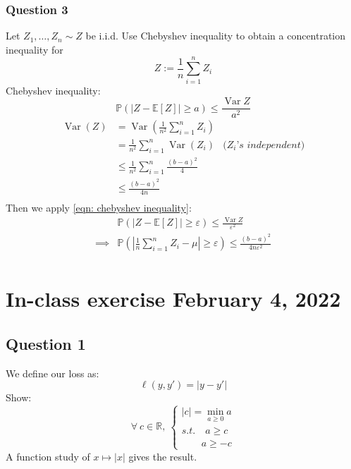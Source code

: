 \documentclass{article}
\newcommand{\1}{\mathbf{1}}
\newcommand{\E}{\mathbb{E}}
\newcommand{\R}{\mathbb{R}}
\renewcommand{\P}{\mathbb{P}}
\newcommand{\var}{\operatorname{Var}}
\begin{document}
\subsubsection{Question 3}
Let \(Z_1, \ldots, Z_n \sim Z\) be i.i.d. Use Chebyshev inequality to obtain a concentration inequality for
\begin{equation*}
  Z := \frac{1}{n} \sum_{i=1}^n Z_i
\end{equation*}
Chebyshev inequality:
\begin{equation}
  \label{eqn: chebyshev inequality}
  \P\left( |Z - \E[Z]| \geq a\right) \leq \frac{\var Z}{a^2}
\end{equation}
\begin{align*}
  \var\left(Z\right)
                                                  & =
  \var\left(\frac{1}{n^2}\sum_{i=1}^n Z_i\right)                                     \\
                                                  & =
  \frac{1}{n^2} \sum_{i=1}^n \var\left(Z_i\right) & \textit{(\(Z_i\)'s independent)} \\
                                                  & \leq
  \frac{1}{n^2} \sum_{i=1}^n \frac{\left(b-a\right)^2}{4}                            \\
                                                  & \leq
  \frac{\left(b-a\right)^2}{4n}                                                      \\
\end{align*}
Then we apply \eqref{eqn: chebyshev inequality}:
\begin{align*}
           &
  \P\left( |Z - \E[Z]| \geq \varepsilon \right) \leq \frac{\var Z}{\varepsilon^2}                                                    \\
  \implies &
  \P\left( \left| \frac{1}{n} \sum_{i=1}^n Z_i - \mu\right| \geq \varepsilon \right) \leq \frac{\left(b-a\right)^2}{4n\varepsilon^2} \\
\end{align*}

\section{In-class exercise February 4, 2022}
\subsection{Question 1}
We define our loss as:
\begin{equation*}
  \ell(y, y') = |y - y'|
\end{equation*}
Show:
\begin{equation*}
  \forall\ c \in \R,\ \begin{cases}
    |c| = \min_{a \geq 0} a \\
    s.t. \quad a \geq c     \\
    \qquad a \geq -c
  \end{cases}
\end{equation*}
A function study of \(x \mapsto |x|\) gives the result.
\end{document}
